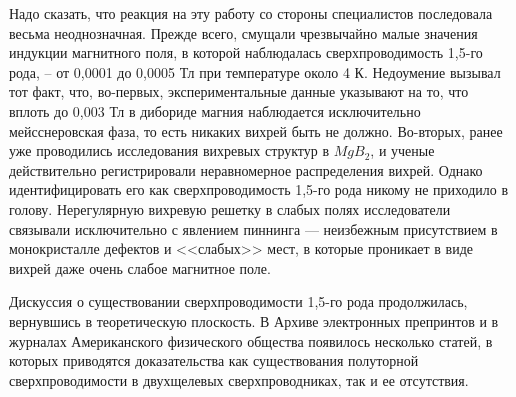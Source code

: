 Надо сказать, что реакция на эту работу со стороны специалистов последовала 
весьма неоднозначная. Прежде всего, смущали чрезвычайно малые значения 
индукции магнитного поля, в которой наблюдалась сверхпроводимость 1,5-го 
рода, -- от 0,0001 до 0,0005 Тл при температуре около 4 К. Недоумение вызывал 
тот факт, что, во-первых, экспериментальные данные указывают на то, что 
вплоть до 0,003 Тл в дибориде магния наблюдается исключительно мейсснеровская 
фаза, то есть никаких вихрей быть не должно. Во-вторых, ранее уже проводились 
исследования вихревых структур в \( MgB_2 \), и ученые действительно 
регистрировали неравномерное распределения вихрей. Однако идентифицировать его 
как сверхпроводимость 1,5-го рода никому не приходило в голову. Нерегулярную 
вихревую решетку в слабых полях исследователи связывали исключительно с 
явлением пиннинга — неизбежным присутствием в монокристалле дефектов и 
<<слабых>> мест, в которые проникает в виде вихрей даже очень слабое 
магнитное поле.

Дискуссия о существовании сверхпроводимости 1,5-го рода продолжилась, 
вернувшись в теоретическую плоскость. В Архиве электронных препринтов и в 
журналах Американского физического общества появилось несколько статей, в 
которых приводятся доказательства как существования полуторной 
сверхпроводимости в двухщелевых сверхпроводниках, так и ее отсутствия. 

\newpage